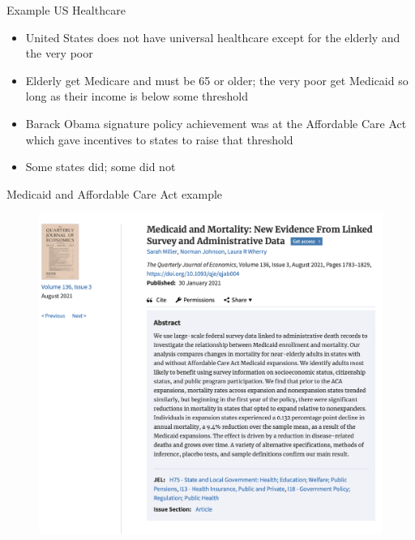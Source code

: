 \documentclass{beamer}
\begin{document}
\begin{frame}{Example US Healthcare}

\begin{itemize}
\item United States does not have universal healthcare except for the elderly and the very poor
\item Elderly get Medicare and must be 65 or older; the very poor get Medicaid so long as their income is below some threshold
\item Barack Obama signature policy achievement was at the Affordable Care Act which gave incentives to states to raise that threshold
\item Some states did; some did not
\end{itemize}

\end{frame}



\begin{frame}{Medicaid and Affordable Care Act example}

\begin{figure}
\includegraphics[scale=0.25]{./lecture_includes/medicaid_qje}
\end{figure}

\end{frame}
\end{document}
